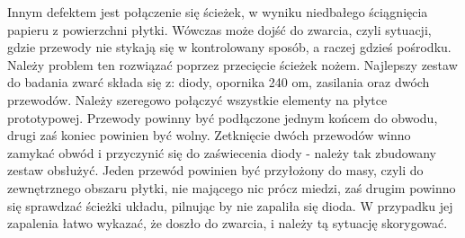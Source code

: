 Innym defektem jest połączenie się ścieżek, w wyniku niedbałego ściągnięcia papieru z powierzchni płytki. Wówczas może dojść do zwarcia, czyli sytuacji, gdzie przewody nie stykają się w kontrolowany sposób, a raczej gdzieś pośrodku.  Należy problem ten rozwiązać poprzez przecięcie ścieżek nożem. Najlepszy zestaw do badania zwarć składa się z: diody, opornika 240 om, zasilania oraz dwóch przewodów. Należy szeregowo połączyć wszystkie elementy na płytce prototypowej. Przewody powinny być podłączone jednym końcem do obwodu, drugi zaś koniec powinien być wolny. Zetknięcie dwóch przewodów winno zamykać obwód i przyczynić się do zaświecenia diody - należy tak zbudowany zestaw obsłużyć. Jeden przewód powinien być przyłożony do masy, czyli do zewnętrznego obszaru płytki, nie mającego nic prócz miedzi, zaś drugim powinno się sprawdzać ścieżki układu, pilnując by nie zapaliła się dioda. W przypadku jej zapalenia łatwo wykazać, że doszło do zwarcia, i należy tą sytuację skorygować.